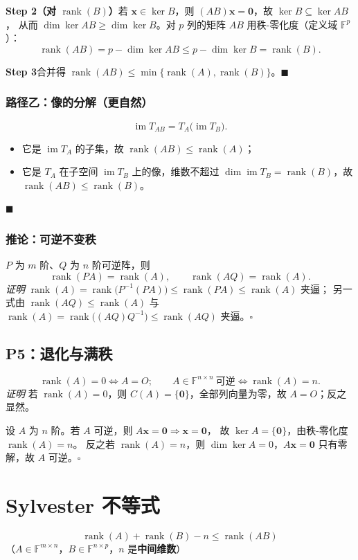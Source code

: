 \documentclass[11pt]{ctexart}
\newcommand{\rank}{\operatorname{rank}}
\newcommand{\im}{\operatorname{im}}
\newcommand{\F}{\mathbb{F}}
\begin{document}
\textbf{Step 2（对 $\rank(B)$）}\quad 若 $\mathbf x\in\ker B$，则 $(AB)\mathbf x=\mathbf 0$，故 $\ker B\subseteq\ker AB$，
从而 $\dim\ker AB\ge\dim\ker B$。对 $p$ 列的矩阵 $AB$ 用秩-零化度（定义域 $\F^p$）：
\[
\rank(AB)=p-\dim\ker AB\le p-\dim\ker B=\rank(B).
\]

\textbf{Step 3}\quad 合并得 $\rank(AB)\le\min\{\rank(A),\rank(B)\}$。\hfill$\blacksquare$

\subsubsection{路径乙：像的分解（更自然）}
\[
\im T_{AB}=T_A\bigl(\im T_B\bigr).
\]
\begin{itemize}
\item 它是 $\im T_A$ 的子集，故 $\rank(AB)\le\rank(A)$；
\item 它是 $T_A$ 在子空间 $\im T_B$ 上的像，维数不超过 $\dim\im T_B=\rank(B)$，故 $\rank(AB)\le\rank(B)$。
\end{itemize}
\hfill$\blacksquare$

\subsubsection{推论：可逆不变秩}
$P$ 为 $m$ 阶、$Q$ 为 $n$ 阶可逆阵，则
\[
\rank(PA)=\rank(A),\qquad\rank(AQ)=\rank(A).
\]
\emph{证明}\quad
$\rank(A)=\rank\bigl(P^{-1}(PA)\bigr)\le\rank(PA)\le\rank(A)$ 夹逼；
另一式由 $\rank(AQ)\le\rank(A)$ 与 $\rank(A)=\rank\bigl((AQ)Q^{-1}\bigr)\le\rank(AQ)$ 夹逼。\hfill$\square$

\subsection{P5：退化与满秩}
\[
\rank(A)=0\iff A=O;\qquad A\in\F^{n\times n}\ \text{可逆}\iff\rank(A)=n .
\]
\emph{证明}\quad
若 $\rank(A)=0$，则 $C(A)=\{\mathbf 0\}$，全部列向量为零，故 $A=O$；反之显然。

设 $A$ 为 $n$ 阶。若 $A$ 可逆，则 $A\mathbf x=\mathbf 0\Rightarrow\mathbf x=\mathbf 0$，
故 $\ker A=\{\mathbf 0\}$，由秩-零化度 $\rank(A)=n$。
反之若 $\rank(A)=n$，则 $\dim\ker A=0$，$A\mathbf x=\mathbf 0$ 只有零解，故 $A$ 可逆。\hfill$\square$

\section{Sylvester 不等式}
\[
\boxed{\ \rank(A)+\rank(B)-n\le\rank(AB)\ }
\]
（$A\in\F^{m\times n}$，$B\in\F^{n\times p}$，$n$ 是\textbf{中间维数}）
\end{document}
